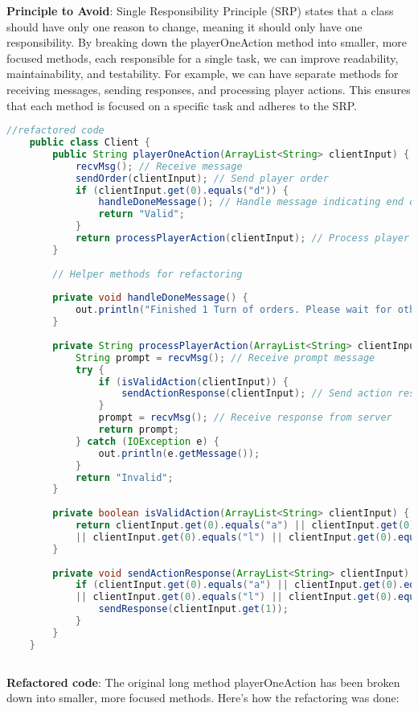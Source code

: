 \documentclass[12pt]{article}
\numberwithin{table}{section}
\begin{document}
	\textbf{Principle to Avoid}: Single Responsibility Principle (SRP) states that a class should have only one reason to change, meaning it should only have one responsibility. By breaking down the playerOneAction method into smaller, more focused methods, each responsible for a single task, we can improve readability, maintainability, and testability. For example, we can have separate methods for receiving messages, sending responses, and processing player actions. This ensures that each method is focused on a specific task and adheres to the SRP.
\begin{lstlisting}[language=Java]
	//refactored code
	public class Client {
		public String playerOneAction(ArrayList<String> clientInput) {
			recvMsg(); // Receive message
			sendOrder(clientInput); // Send player order
			if (clientInput.get(0).equals("d")) {
				handleDoneMessage(); // Handle message indicating end of stage
				return "Valid";
			}
			return processPlayerAction(clientInput); // Process player action and return result
		}
		
		// Helper methods for refactoring
		
		private void handleDoneMessage() {
			out.println("Finished 1 Turn of orders. Please wait for other players to issue orders.");
		}
		
		private String processPlayerAction(ArrayList<String> clientInput) {
			String prompt = recvMsg(); // Receive prompt message
			try {
				if (isValidAction(clientInput)) {
					sendActionResponse(clientInput); // Send action response to server
				}
				prompt = recvMsg(); // Receive response from server
				return prompt;
			} catch (IOException e) {
				out.println(e.getMessage());
			}
			return "Invalid";
		}
		
		private boolean isValidAction(ArrayList<String> clientInput) {
			return clientInput.get(0).equals("a") || clientInput.get(0).equals("m") || clientInput.get(0).equals("u")
			|| clientInput.get(0).equals("l") || clientInput.get(0).equals("s");
		}
		
		private void sendActionResponse(ArrayList<String> clientInput) throws IOException {
			if (clientInput.get(0).equals("a") || clientInput.get(0).equals("m") || clientInput.get(0).equals("u")
			|| clientInput.get(0).equals("l") || clientInput.get(0).equals("s")) {
				sendResponse(clientInput.get(1));
			}
		}
	}
	
\end{lstlisting} 
\textbf{Refactored code}: The original long method playerOneAction has been broken down into smaller, more focused methods. Here's how the refactoring was done:
\end{document}
